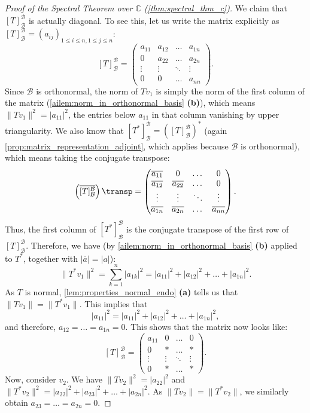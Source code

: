 \begin{proof}[Proof of the Spectral Theorem over $\mathbb{C}$ (\cref{thm:spectral_thm_c})]
We claim that $[T]_{\mathcal{B}}^{\mathcal{B}}$ is actually diagonal. To see this, let us write the matrix explicitly as $[T]_{\mathcal{B}}^{\mathcal{B}} = (a_{ij})_{1 \leq i \leq n, 1 \leq j \leq n}$:
\[
    [T]_{\mathcal{B}}^{\mathcal{B}} = 
    \begin{pmatrix}
        a_{11} & a_{12} & \dots & a_{1n} \\
        0 & a_{22} & \dots & a_{2n} \\
        \vdots & \vdots & \ddots & \vdots \\
        0 & 0 & \dots & a_{nn}
    \end{pmatrix}.
\]
Since $\mathcal{B}$ is orthonormal, the norm of $Tv_1$ is simply the norm of the first column of the matrix (\cref{ailem:norm_in_orthonormal_basis} \textbf{(b)}), which means $\|Tv_1\|^2 = |a_{11}|^2$, the entries below $a_{11}$ in that column vanishing by upper triangularity.
We also know that $[T^*]_{\mathcal{B}}^{\mathcal{B}} = \left([T]_{\mathcal{B}}^{\mathcal{B}}\right)^*$ (again \cref{prop:matrix_representation_adjoint}, which applies because $\mathcal{B}$ is orthonormal), which means taking the conjugate transpose:
\[
    \left( \overline{[T]_{\mathcal{B}}^{\mathcal{B}}} \right)\transp = 
    \begin{pmatrix}
        \overline{a_{11}} & 0 & \dots & 0 \\
        \overline{a_{12}} & \overline{a_{22}} & \dots & 0 \\
        \vdots & \vdots & \ddots & \vdots \\
        \overline{a_{1n}} & \overline{a_{2n}} & \dots & \overline{a_{nn}}
    \end{pmatrix}.
\]
Thus, the first column of $[T^*]_{\mathcal{B}}^{\mathcal{B}}$ is the conjugate transpose of the first row of $[T]_{\mathcal{B}}^{\mathcal{B}}$. Therefore, we have (by \cref{ailem:norm_in_orthonormal_basis} \textbf{(b)} applied to $T^*$, together with $|\overline{a}| = |a|$):
\[
    \|T^*v_1\|^2 = \sum_{k=1}^n |a_{1k}|^2 = |a_{11}|^2 + |a_{12}|^2 + \dots + |a_{1n}|^2.
\]
As $T$ is normal, \cref{lem:properties_normal_endo} \textbf{(a)} tells us that $\|Tv_1\| = \|T^*v_1\|$. This implies that
\[
    |a_{11}|^2 = |a_{11}|^2 + |a_{12}|^2 + \dots + |a_{1n}|^2,
\]
and therefore, $a_{12} = \dots = a_{1n} = 0$. 
This shows that the matrix now looks like:
\[
    [T]_{\mathcal{B}}^{\mathcal{B}} = 
    \begin{pmatrix}
        a_{11} & 0 & \dots & 0 \\
        0 & * & \dots & * \\
        \vdots & \vdots & \ddots & \vdots \\
        0 & * & \dots & *
    \end{pmatrix}.
\]
Now, consider $v_2$. We have $\|Tv_2\|^2 = |a_{22}|^2$ and $\|T^*v_2\|^2 = |a_{22}|^2 + |a_{23}|^2 + \dots + |a_{2n}|^2$. 
As $\|Tv_2\| = \|T^*v_2\|$, we similarly obtain $a_{23} = \dots = a_{2n} = 0$. 


\end{proof}
